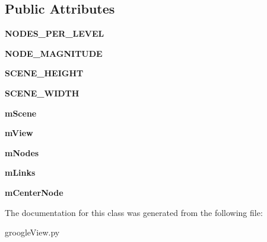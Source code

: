 \subsection*{Public Attributes}
\begin{DoxyCompactItemize}
\item 
\hypertarget{classgroogleView_1_1GroogleView_a4addd838bc4cd03e7a3cacec59f26ecd}{{\bfseries N\-O\-D\-E\-S\-\_\-\-P\-E\-R\-\_\-\-L\-E\-V\-E\-L}}\label{classgroogleView_1_1GroogleView_a4addd838bc4cd03e7a3cacec59f26ecd}

\item 
\hypertarget{classgroogleView_1_1GroogleView_a459953f1f2ffcb48abdbe66305dfe4ec}{{\bfseries N\-O\-D\-E\-\_\-\-M\-A\-G\-N\-I\-T\-U\-D\-E}}\label{classgroogleView_1_1GroogleView_a459953f1f2ffcb48abdbe66305dfe4ec}

\item 
\hypertarget{classgroogleView_1_1GroogleView_aaf7c20dcda7e3f7f5395ebe7618c996f}{{\bfseries S\-C\-E\-N\-E\-\_\-\-H\-E\-I\-G\-H\-T}}\label{classgroogleView_1_1GroogleView_aaf7c20dcda7e3f7f5395ebe7618c996f}

\item 
\hypertarget{classgroogleView_1_1GroogleView_a03f8fa3e684a5177c17f134435185b86}{{\bfseries S\-C\-E\-N\-E\-\_\-\-W\-I\-D\-T\-H}}\label{classgroogleView_1_1GroogleView_a03f8fa3e684a5177c17f134435185b86}

\item 
\hypertarget{classgroogleView_1_1GroogleView_abf02698cd571495c321260df728a2934}{{\bfseries m\-Scene}}\label{classgroogleView_1_1GroogleView_abf02698cd571495c321260df728a2934}

\item 
\hypertarget{classgroogleView_1_1GroogleView_af90c282450a41170e563bd6c88b35f6d}{{\bfseries m\-View}}\label{classgroogleView_1_1GroogleView_af90c282450a41170e563bd6c88b35f6d}

\item 
\hypertarget{classgroogleView_1_1GroogleView_a2e18785ced21ca6d9e10a7de8057f154}{{\bfseries m\-Nodes}}\label{classgroogleView_1_1GroogleView_a2e18785ced21ca6d9e10a7de8057f154}

\item 
\hypertarget{classgroogleView_1_1GroogleView_ab0ad12b0564f4d9ada21a66a4d13a860}{{\bfseries m\-Links}}\label{classgroogleView_1_1GroogleView_ab0ad12b0564f4d9ada21a66a4d13a860}

\item 
\hypertarget{classgroogleView_1_1GroogleView_a9bea3319822eb9bdfc1f9e2b24070e0f}{{\bfseries m\-Center\-Node}}\label{classgroogleView_1_1GroogleView_a9bea3319822eb9bdfc1f9e2b24070e0f}

\end{DoxyCompactItemize}


The documentation for this class was generated from the following file\-:\begin{DoxyCompactItemize}
\item 
groogle\-View.\-py\end{DoxyCompactItemize}
